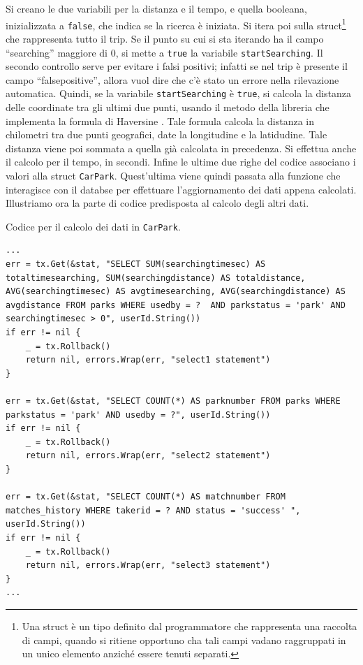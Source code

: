 \documentclass[italian, Lau, oneside, nodefaultfont, noexaminfo]{sapthesis}
\begin{document}
 Si creano le due variabili per la distanza e il tempo, e quella booleana, inizializzata a \texttt{false}, che indica se la ricerca è iniziata. Si itera poi sulla struct\footnote{Una struct è un tipo definito dal programmatore che rappresenta una raccolta di campi, quando si ritiene opportuno cha tali campi vadano raggruppati in un unico elemento anziché essere tenuti separati.} che rappresenta tutto il trip. Se il punto su cui si sta iterando ha il campo ``searching'' maggiore di 0, si mette a \texttt{true} la variabile \texttt{startSearching}. Il secondo controllo serve per evitare i falsi positivi; infatti se nel trip è presente il campo ``falsepositive'', allora vuol dire che c'è stato un errore nella rilevazione automatica. Quindi, se la variabile \texttt{startSearching}  è \texttt{true}, si calcola la distanza delle coordinate tra gli ultimi due punti, usando il metodo della libreria che implementa la formula di Haversine \cite{ref:hv-formula}. Tale formula calcola la distanza in chilometri tra due punti geografici, date  la longitudine e  la latidudine.  Tale distanza viene poi sommata a quella già calcolata in precedenza. Si effettua anche il calcolo  per il  tempo, in secondi. Infine le ultime due righe del codice associano i valori   alla struct \texttt{CarPark}.
Quest'ultima viene quindi passata alla funzione che interagisce con il databse per effettuare l'aggiornamento dei dati appena calcolati.\\


Illustriamo ora la parte di codice predisposta al calcolo degli altri dati.
\begin{listing}[H]
\caption{Codice per il calcolo dei dati in \texttt{CarPark}.}
\begin{verbatim}
...
err = tx.Get(&stat, "SELECT SUM(searchingtimesec) AS totaltimesearching, SUM(searchingdistance) AS totaldistance, AVG(searchingtimesec) AS avgtimesearching, AVG(searchingdistance) AS avgdistance FROM parks WHERE usedby = ?  AND parkstatus = 'park' AND searchingtimesec > 0", userId.String())
if err != nil {
	_ = tx.Rollback()
	return nil, errors.Wrap(err, "select1 statement")
}

err = tx.Get(&stat, "SELECT COUNT(*) AS parknumber FROM parks WHERE parkstatus = 'park' AND usedby = ?", userId.String())
if err != nil {
	_ = tx.Rollback()
	return nil, errors.Wrap(err, "select2 statement")
}

err = tx.Get(&stat, "SELECT COUNT(*) AS matchnumber FROM matches_history WHERE takerid = ? AND status = 'success' ", userId.String())
if err != nil {
	_ = tx.Rollback()
	return nil, errors.Wrap(err, "select3 statement")
}
...
\end{verbatim}
\end{listing}
\end{document}
